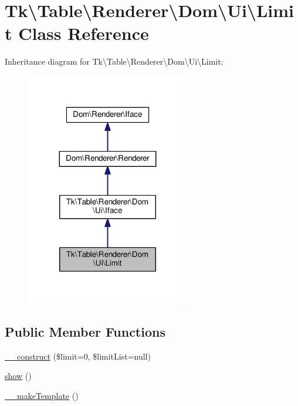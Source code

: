 \hypertarget{classTk_1_1Table_1_1Renderer_1_1Dom_1_1Ui_1_1Limit}{\section{Tk\textbackslash{}Table\textbackslash{}Renderer\textbackslash{}Dom\textbackslash{}Ui\textbackslash{}Limit Class Reference}
\label{classTk_1_1Table_1_1Renderer_1_1Dom_1_1Ui_1_1Limit}
}


Inheritance diagram for Tk\textbackslash{}Table\textbackslash{}Renderer\textbackslash{}Dom\textbackslash{}Ui\textbackslash{}Limit\+:\nopagebreak
\begin{figure}[H]
\begin{center}
\leavevmode
\includegraphics[width=203pt]{classTk_1_1Table_1_1Renderer_1_1Dom_1_1Ui_1_1Limit__inherit__graph}
\end{center}
\end{figure}
\subsection*{Public Member Functions}
\begin{DoxyCompactItemize}
\item 
\hyperlink{classTk_1_1Table_1_1Renderer_1_1Dom_1_1Ui_1_1Limit_adeb01571df9f069020668faa1bd663f0}{\+\_\+\+\_\+construct} (\$limit=0, \$limit\+List=null)
\item 
\hyperlink{classTk_1_1Table_1_1Renderer_1_1Dom_1_1Ui_1_1Limit_a7afabb245a6701c7ebd6f35fa2ffe704}{show} ()
\item 
\hyperlink{classTk_1_1Table_1_1Renderer_1_1Dom_1_1Ui_1_1Limit_a66e166e6de39426d8d155adb5e2dd9a2}{\+\_\+\+\_\+make\+Template} ()
\end{DoxyCompactItemize}
